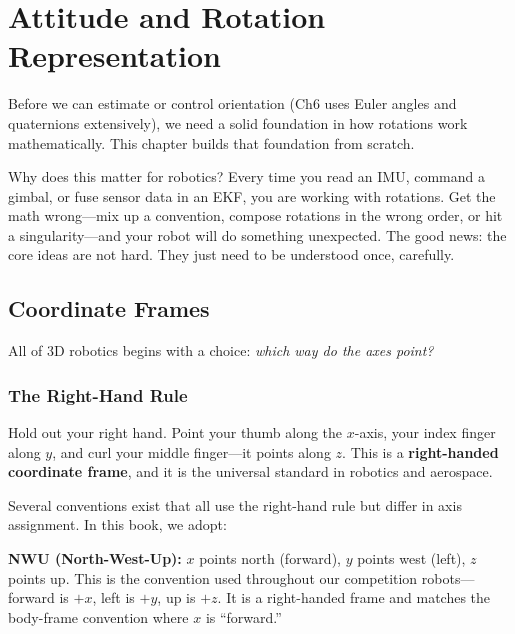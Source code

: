 \section{Attitude and Rotation Representation}

Before we can estimate or control orientation (Ch6 uses Euler angles and quaternions extensively), we need a solid foundation in how rotations work mathematically. This chapter builds that foundation from scratch.

Why does this matter for robotics? Every time you read an IMU, command a gimbal, or fuse sensor data in an EKF, you are working with rotations. Get the math wrong---mix up a convention, compose rotations in the wrong order, or hit a singularity---and your robot will do something unexpected. The good news: the core ideas are not hard. They just need to be understood once, carefully.

\subsection{Coordinate Frames}

All of 3D robotics begins with a choice: \textit{which way do the axes point?}

\subsubsection{The Right-Hand Rule}

Hold out your right hand. Point your thumb along the $x$-axis, your index finger along $y$, and curl your middle finger---it points along $z$. This is a \textbf{right-handed coordinate frame}, and it is the universal standard in robotics and aerospace.

Several conventions exist that all use the right-hand rule but differ in axis assignment. In this book, we adopt:

\textbf{NWU (North-West-Up):} $x$ points north (forward), $y$ points west (left), $z$ points up. This is the convention used throughout our competition robots---forward is $+x$, left is $+y$, up is $+z$. It is a right-handed frame and matches the body-frame convention where $x$ is ``forward.''

